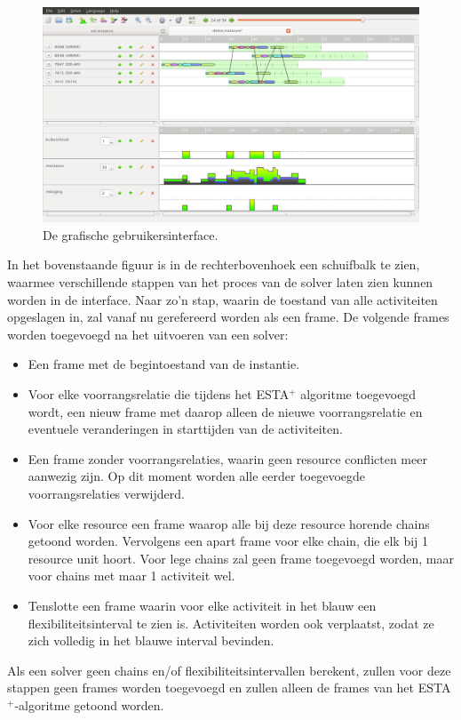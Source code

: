 \begin{figure}
\includegraphics[width=\textwidth]{../images/GUIfinal.png}
\caption{De grafische gebruikersinterface.}
\label{fig:GUIfinal}
\end{figure}

In het bovenstaande figuur is in de rechterbovenhoek een schuifbalk te zien, waarmee verschillende stappen van het proces van de solver laten zien kunnen worden in de interface. Naar zo'n stap, waarin de toestand van alle activiteiten opgeslagen in, zal vanaf nu gerefereerd worden als een frame. De volgende frames worden toegevoegd na het uitvoeren van een solver:
\begin{itemize}
\item Een frame met de begintoestand van de instantie.
\item Voor elke voorrangsrelatie die tijdens het ESTA$^+$ algoritme toegevoegd wordt, een nieuw frame met daarop alleen de nieuwe voorrangsrelatie en eventuele veranderingen in starttijden van de activiteiten.
\item Een frame zonder voorrangsrelaties, waarin geen resource conflicten meer aanwezig zijn. Op dit moment worden alle eerder toegevoegde voorrangsrelaties verwijderd.
\item Voor elke resource een frame waarop alle bij deze resource horende chains getoond worden. Vervolgens een apart frame voor elke chain, die elk bij 1 resource unit hoort. Voor lege chains zal geen frame toegevoegd worden, maar voor chains met maar 1 activiteit wel.
\item Tenslotte een frame waarin voor elke activiteit in het blauw een flexibiliteitsinterval te zien is. Activiteiten worden ook verplaatst, zodat ze zich volledig in het blauwe interval bevinden.
\end{itemize}
Als een solver geen chains en/of flexibiliteitsintervallen berekent, zullen voor deze stappen geen frames worden toegevoegd en zullen alleen de frames van het ESTA$^+$-algoritme getoond worden.

